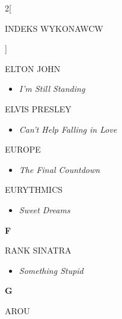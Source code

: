 \documentclass[a4paper]{report}
\begin{document}
\begin{multicols*}{2}[\begin{Huge}INDEKS WYKONAWCW\end{Huge}\vspace{1cm}]
\begin{minipage}{\columnwidth}
\end{minipage}
\begin{minipage}{\columnwidth}
	ELTON JOHN 
	\begin{itemize}[topsep=3pt, after=\vspace{3mm}]
		\itemsep0em
		\item[]\textit{I'm Still Standing}  \\
	\end{itemize}
\end{minipage}
\begin{minipage}{\columnwidth}
	ELVIS PRESLEY 
	\begin{itemize}[topsep=3pt, after=\vspace{3mm}]
		\itemsep0em
		\item[]\textit{Can't Help Falling in Love}  \\
	\end{itemize}
\end{minipage}
\begin{minipage}{\columnwidth}
	EUROPE 
	\begin{itemize}[topsep=3pt, after=\vspace{3mm}]
		\itemsep0em
		\item[]\textit{The Final Countdown}  \\
	\end{itemize}
\end{minipage}
\begin{minipage}{\columnwidth}
	EURYTHMICS 
	\begin{itemize}[topsep=3pt, after=\vspace{3mm}]
		\itemsep0em
		\item[]\textit{Sweet Dreams}  \\
	\end{itemize}
\end{minipage}
\begin{minipage}{\columnwidth}
	\begin{Large}\textbf{F}\end{Large}RANK SINATRA 
	\begin{itemize}[topsep=3pt, after=\vspace{3mm}]
		\itemsep0em
		\item[]\textit{Something Stupid}  \\
	\end{itemize}
\end{minipage}
\begin{minipage}{\columnwidth}
	\begin{Large}\textbf{G}\end{Large}AROU 

\end{minipage}
\end{multicols*}
\end{document}
